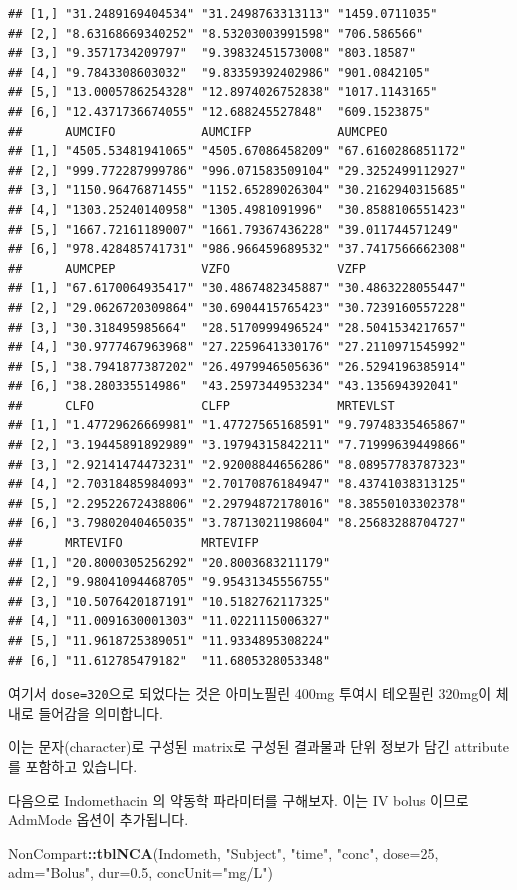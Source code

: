 \documentclass[12pt,]{krantz}
\newenvironment{Shaded}{\begin{snugshade}}{\end{snugshade}}
\newcommand{\KeywordTok}[1]{\textcolor[rgb]{0.13,0.29,0.53}{\textbf{#1}}}
\newcommand{\DataTypeTok}[1]{\textcolor[rgb]{0.13,0.29,0.53}{#1}}
\newcommand{\DecValTok}[1]{\textcolor[rgb]{0.00,0.00,0.81}{#1}}
\newcommand{\FloatTok}[1]{\textcolor[rgb]{0.00,0.00,0.81}{#1}}
\newcommand{\StringTok}[1]{\textcolor[rgb]{0.31,0.60,0.02}{#1}}
\newcommand{\OperatorTok}[1]{\textcolor[rgb]{0.81,0.36,0.00}{\textbf{#1}}}
\newcommand{\NormalTok}[1]{#1}
\theoremstyle{definition}
\theoremstyle{definition}
\theoremstyle{definition}
\theoremstyle{remark}
\begin{document}
\begin{verbatim}
## [1,] "31.2489169404534" "31.2498763313113" "1459.0711035"
## [2,] "8.63168669340252" "8.53203003991598" "706.586566"  
## [3,] "9.3571734209797"  "9.39832451573008" "803.18587"   
## [4,] "9.7843308603032"  "9.83359392402986" "901.0842105" 
## [5,] "13.0005786254328" "12.8974026752838" "1017.1143165"
## [6,] "12.4371736674055" "12.688245527848"  "609.1523875" 
##      AUMCIFO            AUMCIFP            AUMCPEO           
## [1,] "4505.53481941065" "4505.67086458209" "67.6160286851172"
## [2,] "999.772287999786" "996.071583509104" "29.3252499112927"
## [3,] "1150.96476871455" "1152.65289026304" "30.2162940315685"
## [4,] "1303.25240140958" "1305.4981091996"  "30.8588106551423"
## [5,] "1667.72161189007" "1661.79367436228" "39.011744571249" 
## [6,] "978.428485741731" "986.966459689532" "37.7417566662308"
##      AUMCPEP            VZFO               VZFP              
## [1,] "67.6170064935417" "30.4867482345887" "30.4863228055447"
## [2,] "29.0626720309864" "30.6904415765423" "30.7239160557228"
## [3,] "30.318495985664"  "28.5170999496524" "28.5041534217657"
## [4,] "30.9777467963968" "27.2259641330176" "27.2110971545992"
## [5,] "38.7941877387202" "26.4979946505636" "26.5294196385914"
## [6,] "38.280335514986"  "43.2597344953234" "43.135694392041" 
##      CLFO               CLFP               MRTEVLST          
## [1,] "1.47729626669981" "1.47727565168591" "9.79748335465867"
## [2,] "3.19445891892989" "3.19794315842211" "7.71999639449866"
## [3,] "2.92141474473231" "2.92008844656286" "8.08957783787323"
## [4,] "2.70318485984093" "2.70170876184947" "8.43741038313125"
## [5,] "2.29522672438806" "2.29794872178016" "8.38550103302378"
## [6,] "3.79802040465035" "3.78713021198604" "8.25683288704727"
##      MRTEVIFO           MRTEVIFP          
## [1,] "20.8000305256292" "20.8003683211179"
## [2,] "9.98041094468705" "9.95431345556755"
## [3,] "10.5076420187191" "10.5182762117325"
## [4,] "11.0091630001303" "11.0221115006327"
## [5,] "11.9618725389051" "11.9334895308224"
## [6,] "11.612785479182"  "11.6805328053348"
\end{verbatim}

여기서 \texttt{dose=320}으로 되었다는 것은 아미노필린 400mg 투여시
테오필린 320mg이 체내로 들어감을 의미합니다.

이는 문자(character)로 구성된 matrix로 구성된 결과물과 단위 정보가 담긴
attribute를 포함하고 있습니다.

다음으로 Indomethacin 의 약동학 파라미터를 구해보자. 이는 IV bolus
이므로 AdmMode 옵션이 추가됩니다.

\begin{Shaded}
\begin{Highlighting}[]
\NormalTok{NonCompart}\OperatorTok{::}\KeywordTok{tblNCA}\NormalTok{(Indometh, }\StringTok{"Subject"}\NormalTok{, }\StringTok{"time"}\NormalTok{, }\StringTok{"conc"}\NormalTok{, }\DataTypeTok{dose=}\DecValTok{25}\NormalTok{, }\DataTypeTok{adm=}\StringTok{"Bolus"}\NormalTok{, }\DataTypeTok{dur=}\FloatTok{0.5}\NormalTok{, }\DataTypeTok{concUnit=}\StringTok{"mg/L"}\NormalTok{)}
\end{Highlighting}
\end{Shaded}
\end{document}
